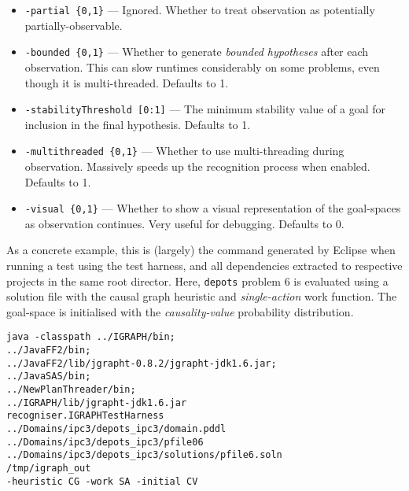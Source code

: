\documentclass[10pt,a4paper]{article}
\begin{document}
\begin{sloppypar}
\begin{itemize}
\item \texttt{-partial \{0,1\}} --- Ignored. Whether to treat observation as potentially partially-observable.

\item \texttt{-bounded \{0,1\}} --- Whether to generate \emph{bounded hypotheses} after each observation. This can slow runtimes considerably on some problems, even though it is multi-threaded. Defaults to 1.

\item \texttt{-stabilityThreshold [0:1]} --- The minimum stability value of a goal for inclusion in the final hypothesis. Defaults to 1.

\item \texttt{-multithreaded \{0,1\}} --- Whether to use multi-threading during observation. Massively speeds up the recognition process when enabled. Defaults to 1.

\item \texttt{-visual \{0,1\}} --- Whether to show a visual representation of the goal-spaces as observation continues. Very useful for debugging. Defaults to 0.

\end{itemize}


As a concrete example, this is (largely) the command generated by Eclipse when running a test using the test harness, and all dependencies extracted to respective projects in the same root director. Here, \texttt{depots} problem 6 is evaluated using a solution file with the causal graph heuristic \cite{Helmert04} and \emph{single-action} work function. The goal-space is initialised with the \emph{causality-value} probability distribution.

\noindent 
\texttt{java  -classpath ../IGRAPH/bin;\\\indent ../JavaFF2/bin;\\\indent ../JavaFF2/lib/jgrapht-0.8.2/jgrapht-jdk1.6.jar;\\\indent ../JavaSAS/bin;\\\indent ../NewPlanThreader/bin;\\\indent ../IGRAPH/lib/jgrapht-jdk1.6.jar\\ recogniser.IGRAPHTestHarness\\\indent  ../Domains/ipc3/depots\_ipc3/domain.pddl\\\indent  ../Domains/ipc3/depots\_ipc3/pfile06\\\indent  ../Domains/ipc3/depots\_ipc3/solutions/pfile6.soln\\\indent  /tmp/igraph\_out\\ -heuristic CG -work SA -initial CV}


\end{sloppypar}
\end{document}
